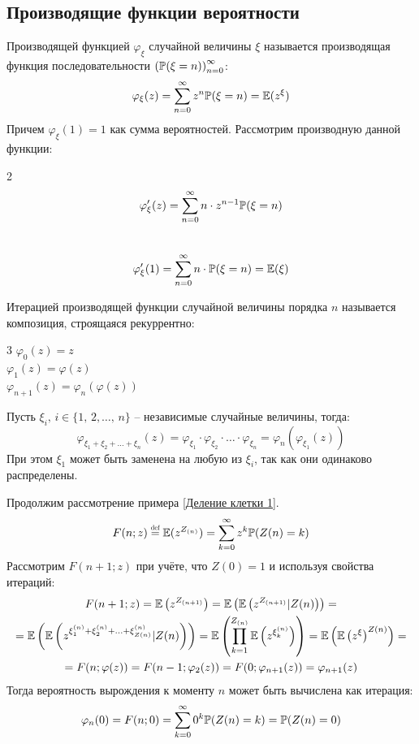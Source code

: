 \documentclass[12pt]{article}
\begin{document}
\subsection{Производящие функции вероятности}

\begin{definition}
    Производящей функцией $\varphi_\xi$ случайной величины $\xi$ называется производящая функция последовательности $\left(\mathbb{P}(\xi=n)\right)^\infty_{n=0}$:
    $$\varphi_\xi(z)=\sum_{n=0}^{\infty}z^n\mathbb{P}(\xi=n)=\mathbb{E}(z^\xi)$$
    Причем $\varphi_\xi(1)=1$ как сумма вероятностей. Рассмотрим производную данной функции:
    \begin{multicols}{2}
        \centering
        \[\varphi'_\xi(z)=\sum_{n=0}^\infty n\cdot z^{n-1}\mathbb{P}(\xi=n)\]\\
        \[\varphi'_\xi(1)=\sum_{n=0}^\infty n\cdot \mathbb{P}(\xi=n)=\mathbb{E}(\xi)\]
    \end{multicols}
\end{definition}
\begin{definition}
    Итерацией производящей функции случайной величины порядка $n$ называется композиция, строящаяся рекуррентно:
    \begin{multicols}{3}
        \centering
        $\varphi_0(z)=z$\\
        $\varphi_1(z)=\varphi(z)$\\
        $\varphi_{n+1}(z)=\varphi_n(\varphi(z))$
    \end{multicols}
\end{definition}
\begin{definition}
    Пусть $\xi_i,\,i\in\{1,\,2,\ldots,\,n\}$ – независимые случайные величины, тогда:
    $$\varphi_{\xi_1+\xi_2+\ldots+\xi_n}(z)=\varphi_{\xi_1}\cdot\varphi_{\xi_2}\cdot\ldots\cdot\varphi_{\xi_n}=\varphi_n(\varphi_{\xi_1}(z))$$
    При этом $\xi_1$ может быть заменена на любую из $\xi_i$, так как они одинаково распределены.
\end{definition}
\begin{example}\label{Деление клетки 2}
    Продолжим рассмотрение примера \ref{Деление клетки 1}.
    $$F(n;z)\defeq\E(z^{Z_{(n)}})=\sum_{k=0}^{\infty}z^k\prob(Z(n)=k)$$
    Рассмотрим $F(n+1;z)$ при учёте, что $Z(0)=1$ и используя свойства итераций:
    \begin{multline*}
        F(n+1;z)=\mathbb{E}\left(z^{Z_{(n+1)}}\right)=\mathbb{E}\left(\mathbb{E}\left(z^{Z_{(n+1)}}|Z(n)\right)\right)=\\
        =\mathbb{E}\left(\mathbb{E}\left(z^{\xi_1^{(n)}+\xi_2^{(n)}+\ldots+\xi_{Z(n)}^{(n)}}|Z(n)\right)\right)=\mathbb{E}\left(\prod_{k=1}^{Z_{(n)}}\mathbb{E}\left(z^{\xi_k^{(n)}}\right)\right)=\mathbb{E}\left(\mathbb{E}\left(z^\xi\right)^{Z(n)}\right)=\\
        =F(n;\varphi(z))=F(n-1;\varphi_2(z))=F(0;\varphi_{n+1}(z))=\varphi_{n+1}(z)
    \end{multline*}
    Тогда вероятность вырождения к моменту $n$ может быть вычислена как итерация:
    $$\varphi_n(0)=F(n;0)=\sum_{k=0}^{\infty}0^k\mathbb{P}(Z(n)=k)=\mathbb{P}(Z(n)=0)$$
\end{example}
\end{document}
